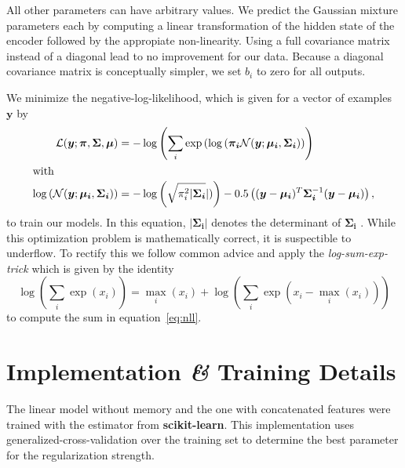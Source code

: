 \documentclass[nobib, a4paper]{tufte-handout}
\begin{document}
All other parameters can have arbitrary values.
We predict the Gaussian mixture parameters each by computing a linear transformation of the hidden state of the encoder followed by the appropiate non-linearity.
Using a full covariance matrix instead of a diagonal lead to no improvement for our data.
Because a diagonal covariance matrix is conceptually simpler, we set \(b_i\) to zero for all outputs.%

We minimize the negative-log-likelihood, which is given for a vector of examples \(\bm{y}\) by
\begin{align}
  \label{eq:nll}
 \mathcal{L} (\bm{y}; \bm{\pi}, \bm{\Sigma}, \bm{\mu}) &= - \log \left(  \sum_i \exp \left(  \log \left( \bm{\pi_i} \mathcal{N} (\bm{y}; \bm{\mu_i}, \bm{\Sigma_i} \right) \right) \right) \\ 
  \intertext{with}
  \log \left( \mathcal{N} (\bm{y}; \bm{\mu_i}, \bm{\Sigma_i}) \right) &= 
 -\log \left( \sqrt{\pi_i^2 \vert \bm{\Sigma_i}} \vert)  \right) - 0.5 \left( (\bm{y} - \bm{\mu_i})^T \bm{\Sigma_i}^{-1} (\bm{y} - \bm{\mu_i}) \right),\nonumber
\end{align}
to train our models.
In this equation, \(\vert \bm{\Sigma_i} \vert\) denotes the determinant of \(\bm{\Sigma_i}\)%
.
While this optimization problem is mathematically correct, it is suspectible to underflow.
To rectify this we follow common advice and apply the \textit{log-sum-exp-trick} which is given by the identity
\begin{equation*}
  \log \left( \sum_i \exp (x_i) \right) = \max_i (x_i) + \log \left( \sum_i \exp (x_i - \max_i (x_i)) \right)
\end{equation*}
to compute the sum in equation~\ref{eq:nll}\autocite{mdnMaster}.

\section{Implementation \textit{\&} Training Details}
The linear model without memory and the one with concatenated features were trained with the  estimator from \textbf{scikit-learn}\autocite{scikitLearn}.
This implementation uses generalized-cross-validation over the training set to determine the best parameter for the regularization strength.
\end{document}
